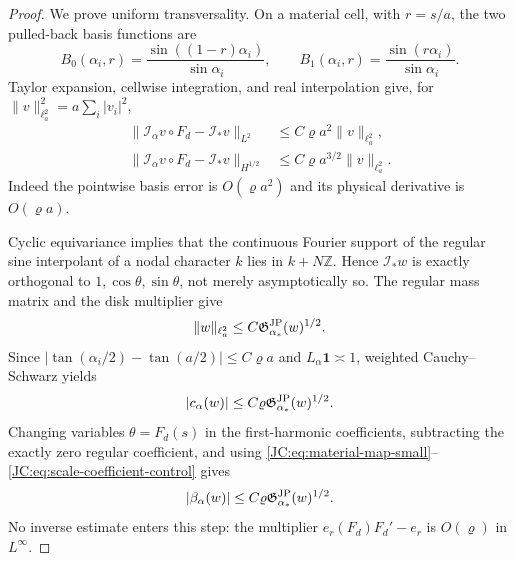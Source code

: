 \documentclass[11pt]{amsart}
\numberwithin{equation}{section}
\theoremstyle{definition}
\theoremstyle{remark}
\newcommand{\Gjp}{\mathfrak G^{\rm JP}}
\begin{document}
\begin{proof}
We prove uniform transversality.  On a material cell, with $r=s/a$, the
two pulled-back basis functions are
\[
 B_0(\alpha_i,r)=\frac{\sin((1-r)\alpha_i)}{\sin\alpha_i},
 \qquad
 B_1(\alpha_i,r)=\frac{\sin(r\alpha_i)}{\sin\alpha_i}.
\]
Taylor expansion, cellwise integration, and real interpolation give, for
$\|v\|_{\ell_a^2}^2=a\sum_i|v_i|^2$,
\begin{align}
 \|\mathcal I_\alpha v\circ F_d-\mathcal I_*v\|_{L^2}
 &\le C\varrho a^2\|v\|_{\ell_a^2},\label{JC:eq:material-L2-error}\\
 \|\mathcal I_\alpha v\circ F_d-\mathcal I_*v\|_{H^{1/2}}
 &\le C\varrho a^{3/2}\|v\|_{\ell_a^2}.
 \label{JC:eq:material-Hhalf-error}
\end{align}
Indeed the pointwise basis error is $O(\varrho a^2)$ and its physical
derivative is $O(\varrho a)$.

Cyclic equivariance implies that the continuous Fourier support of the
regular sine interpolant of a nodal character $k$ lies in
$k+N\mathbb Z$.  Hence $\mathcal I_*w$ is exactly orthogonal to
$1,\cos\theta,\sin\theta$, not merely asymptotically so.  The regular
mass matrix and the disk multiplier give
\begin{equation}\label{JC:eq:regular-mass-G-control}
 \|w\|_{\ell_a^2}\le C\Gjp_{\alpha_*}(w)^{1/2}.
\end{equation}
Since
$|\tan(\alpha_i/2)-\tan(a/2)|\le C\varrho a$ and
$L_\alpha\mathbf1\asymp1$, weighted Cauchy--Schwarz yields
\begin{equation}\label{JC:eq:scale-coefficient-control}
 |c_\alpha(w)|\le C\varrho\Gjp_{\alpha_*}(w)^{1/2}.
\end{equation}
Changing variables $\theta=F_d(s)$ in the first-harmonic coefficients,
subtracting the exactly zero regular coefficient, and using
\eqref{JC:eq:material-map-small}--\eqref{JC:eq:scale-coefficient-control} gives
\begin{equation}\label{JC:eq:translation-coefficient-control}
 |\beta_\alpha(w)|\le C\varrho\Gjp_{\alpha_*}(w)^{1/2}.
\end{equation}
No inverse estimate enters this step: the multiplier
$e_r(F_d)F_d'-e_r$ is $O(\varrho)$ in $L^\infty$.


\end{proof}
\end{document}
